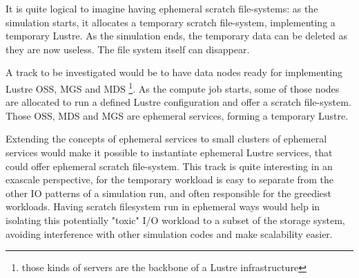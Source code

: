 It is quite logical to imagine having ephemeral scratch file-systems: as the simulation starts, it allocates a
temporary scratch file-system, implementing a temporary Lustre. As the simulation ends, the temporary data can
be deleted as they are now useless. The file system itself can disappear. 

A track to be investigated would be to have data nodes ready for implementing Lustre OSS, MGS and MDS
\footnote{those kinds of servers are the backbone of a Lustre infrastructure}. As the compute job starts, some
of those nodes are allocated to run a defined Lustre configuration and offer a scratch file-system. Those
OSS, MDS and MGS are ephemeral services, forming a temporary Lustre. 

Extending the concepts of ephemeral services to small clusters of ephemeral services would make it possible to 
instantiate ephemeral Lustre services, that could offer ephemeral scratch file-system. This track is quite
interesting in an exascale perspective, for the temporary workload is easy to separate from the other IO patterns
of a simulation run, and often responsible for the greediest workloads. Having scratch filesystem run in 
ephemeral ways would help in isolating this potentially "toxic" I/O workload to a subset of the storage system,
avoiding interference with other simulation codes and make scalability easier. 